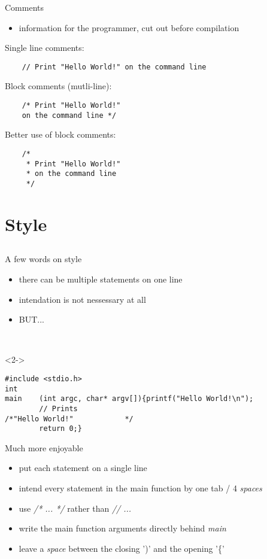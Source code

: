 \begin{frame}[fragile]{Comments}
	\begin{itemize}
		\item information for the programmer, cut out before compilation
	\end{itemize}
	Single line comments:
	\begin{lstlisting}
	// Print "Hello World!" on the command line
\end{lstlisting}
	Block comments (mutli-line):
	\begin{lstlisting}
	/* Print "Hello World!"
	on the command line */
\end{lstlisting}
	Better use of block comments:
	\begin{lstlisting}
	/*
	 * Print "Hello World!"
	 * on the command line
	 */
\end{lstlisting}
\end{frame}
\section{Style}
\subsection{}
\begin{frame}[fragile]{A few words on style}
	\begin{itemize}
		\item {there can be multiple statements on one line}
		\item {intendation is not nessessary at all}
		\item<2-> BUT...
	\end{itemize}
	\ \\
	\begin{uncoverenv}<2->
	\begin{lstlisting}[numbers=none]
#include <stdio.h>
int
main	(int argc, char* argv[]){printf("Hello World!\n");
		// Prints
/*"Hello World!"			*/
		return 0;}
\end{lstlisting}
	\end{uncoverenv}
\end{frame}
\begin{frame}{Much more enjoyable}
	\begin{itemize}
		\item put each statement on a single line
		\item intend every statement in the main function by one tab / 4 \textit{spaces}
		\item use \textit{/* ... */} rather than \textit{// ...}
		\item write the main function arguments directly behind \textit{main}
		\item leave a \textit{space} between the closing ')' and the opening '\{'
	\end{itemize}
\end{frame}



